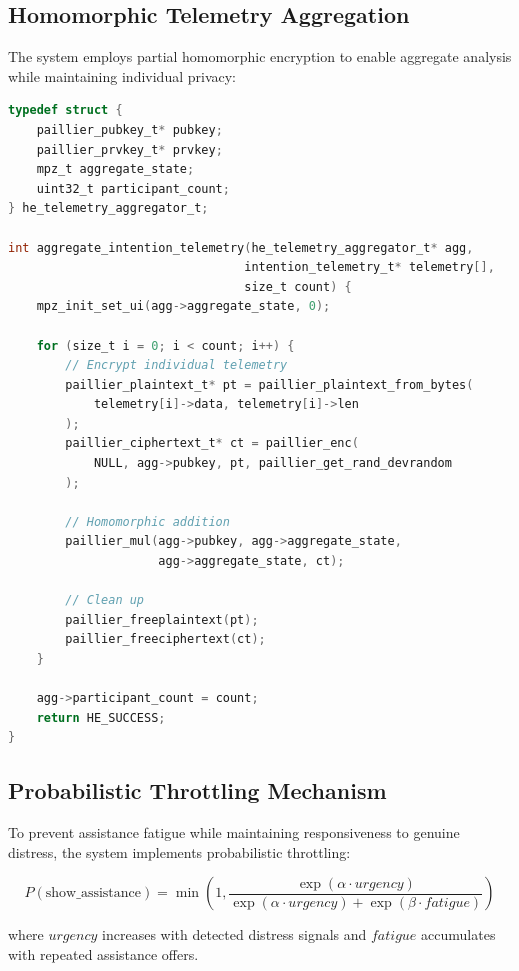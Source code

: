 \documentclass[11pt,a4paper]{article}
\begin{document}
\subsection{Homomorphic Telemetry Aggregation}

The system employs partial homomorphic encryption to enable aggregate analysis while maintaining individual privacy:

\begin{lstlisting}[language=C, caption=Homomorphic Telemetry Aggregation]
typedef struct {
    paillier_pubkey_t* pubkey;
    paillier_prvkey_t* prvkey;
    mpz_t aggregate_state;
    uint32_t participant_count;
} he_telemetry_aggregator_t;

int aggregate_intention_telemetry(he_telemetry_aggregator_t* agg,
                                 intention_telemetry_t* telemetry[],
                                 size_t count) {
    mpz_init_set_ui(agg->aggregate_state, 0);
    
    for (size_t i = 0; i < count; i++) {
        // Encrypt individual telemetry
        paillier_plaintext_t* pt = paillier_plaintext_from_bytes(
            telemetry[i]->data, telemetry[i]->len
        );
        paillier_ciphertext_t* ct = paillier_enc(
            NULL, agg->pubkey, pt, paillier_get_rand_devrandom
        );
        
        // Homomorphic addition
        paillier_mul(agg->pubkey, agg->aggregate_state, 
                     agg->aggregate_state, ct);
        
        // Clean up
        paillier_freeplaintext(pt);
        paillier_freeciphertext(ct);
    }
    
    agg->participant_count = count;
    return HE_SUCCESS;
}
\end{lstlisting}

\subsection{Probabilistic Throttling Mechanism}

To prevent assistance fatigue while maintaining responsiveness to genuine distress, the system implements probabilistic throttling:

\begin{equation}
P(\text{show\_assistance}) = \min\left(1, \frac{\exp(\alpha \cdot urgency)}{\exp(\alpha \cdot urgency) + \exp(\beta \cdot fatigue)}\right)
\end{equation}

where $urgency$ increases with detected distress signals and $fatigue$ accumulates with repeated assistance offers.
\end{document}
